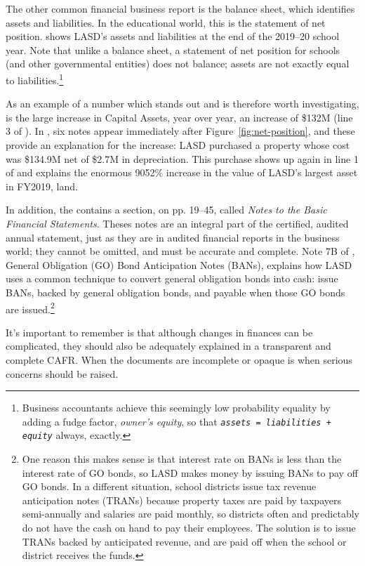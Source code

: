 The other common financial business report is the balance sheet, which identifies assets and liabilities. In the educational world, this is the statement of net position.  shows LASD's assets and liabilities at the end of the 2019–20 school year. Note that unlike a balance sheet, a statement of net position for schools (and other governmental entities) does not balance; assets are not exactly equal to liabilities.\footnote{Business accountants achieve this seemingly low probability equality by adding a fudge factor, \textit{owner's equity}, so that \texttt{\textit{assets = liabilities + equity}} always, exactly.}

As an example of a number which stands out and is therefore worth investigating, is the large increase in Capital Assets, year over year, an increase of \$132M (line 3 of ). In , six notes appear immediately after Figure~\ref{fig:net-position}, and these provide an explanation for the increase: LASD purchased a property whose cost was \$134.9M net of \$2.7M in depreciation. This purchase shows up again in line 1 of  and explains the enormous 9052\% increase in the value of LASD's largest asset in FY2019, land.

In addition, the  contains a section, on pp. 19–45, called \textit{Notes to the Basic Financial Statements}. Theses notes are an integral part of the certified, audited annual statement, just as they are in audited financial reports in the business world; they cannot be omitted, and must be accurate and complete.  Note 7B of \textcite[7]{Kenyon2021}, General Obligation (GO) Bond Anticipation Notes (BANs), explains how LASD uses a common
technique to convert general obligation bonds into cash: issue BANs, backed by general obligation bonds, and payable when those GO bonds are issued.\footnote{One reason this makes sense is that interest rate on BANs is less than the interest rate of GO bonds, so LASD makes money by issuing BANs to pay off GO bonds. In a different situation, school districts issue tax revenue anticipation notes (TRANs) because property taxes are paid by taxpayers semi-annually and salaries are paid monthly, so districts often and predictably do not have the cash on hand to pay their employees. The solution is to issue TRANs backed by anticipated revenue, and are paid off when the school or district receives the funds.}

It's important to remember is that although changes in finances can be complicated, they should also be adequately explained in a transparent and complete CAFR\@. When the documents are incomplete or opaque is when serious concerns should be raised. %

